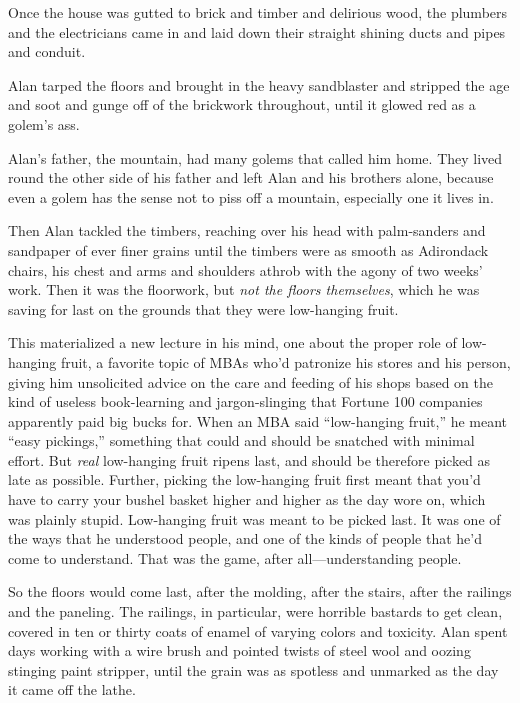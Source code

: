 \documentclass{article}
\begin{document}
Once the house was gutted to brick and timber and delirious wood, the
plumbers and the electricians came in and laid down their straight
shining ducts and pipes and conduit.

Alan tarped the floors and brought in the heavy sandblaster and
stripped the age and soot and gunge off of the brickwork throughout,
until it glowed red as a golem's ass.

Alan's father, the mountain, had many golems that called him home. 
They lived round the other side of his father and left Alan and his
brothers alone, because even a golem has the sense not to piss off a
mountain, especially one it lives in.

Then Alan tackled the timbers, reaching over his head with
palm-sanders and sandpaper of ever finer grains until the timbers were
as smooth as Adirondack chairs, his chest and arms and shoulders
athrob with the agony of two weeks' work.  Then it was the floorwork,
but \textit{not the floors themselves}, which he was saving for last
on the grounds that they were low-hanging fruit.

This materialized a new lecture in his mind, one about the proper role
of low-hanging fruit, a favorite topic of MBAs who'd patronize his
stores and his person, giving him unsolicited advice on the care and
feeding of his shops based on the kind of useless book-learning and
jargon-slinging that Fortune 100 companies apparently paid big bucks
for.  When an MBA said ``low-hanging fruit,'' he meant ``easy
pickings,'' something that could and should be snatched with minimal
effort.  But \textit{real} low-hanging fruit ripens last, and should
be therefore picked as late as possible.  Further, picking the
low-hanging fruit first meant that you'd have to carry your bushel
basket higher and higher as the day wore on, which was plainly stupid. 
Low-hanging fruit was meant to be picked last.  It was one of the ways
that he understood people, and one of the kinds of people that he'd
come to understand.  That was the game, after all---understanding
people.

So the floors would come last, after the molding, after the stairs,
after the railings and the paneling.  The railings, in particular,
were horrible bastards to get clean, covered in ten or thirty coats of
enamel of varying colors and toxicity.  Alan spent days working with a
wire brush and pointed twists of steel wool and oozing stinging paint
stripper, until the grain was as spotless and unmarked as the day it
came off the lathe.
\end{document}
